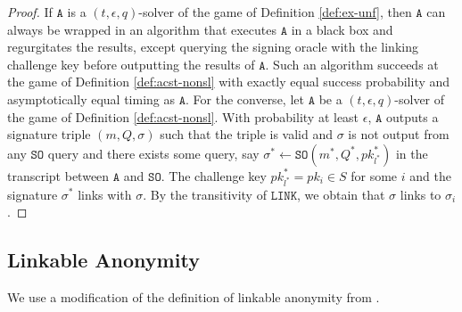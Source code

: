 \documentclass{llncs}
\begin{document}
\begin{proof}
If $\texttt{A}$ is a $(t, \epsilon, q)$-solver of the game of Definition \ref{def:ex-unf}, then $\texttt{A}$ can always be wrapped in an algorithm that executes $\texttt{A}$ in a black box and regurgitates the results, except querying the signing oracle with the linking challenge key before outputting the results of $\texttt{A}$. Such an algorithm succeeds at the game of Definition \ref{def:acst-nonsl} with exactly equal success probability and asymptotically equal timing as $\texttt{A}$. For the converse, let $\texttt{A}$ be a $(t, \epsilon, q)$-solver of the game of Definition \ref{def:acst-nonsl}. With probability at least $\epsilon$, $\texttt{A}$ outputs a signature triple $(m, Q, \sigma)$ such that the triple is valid and $\sigma$ is not output from any $\texttt{SO}$ query and there exists some query, say $\sigma^* \leftarrow \texttt{SO}(m^*, Q^*, pk^*_{l^*})$ in the transcript between $\texttt{A}$ and $\texttt{SO}$. The challenge key $pk^*_{l^*} = pk_i \in S$ for some $i$ and the signature $\sigma^*$ links with $\sigma$.  By the transitivity of $\texttt{LINK}$, we obtain that $\sigma$ links to $\sigma_i$.
\end{proof}


\subsection{Linkable Anonymity}

We use a modification of the definition of linkable anonymity from \cite{backes2019ring}.
\end{document}
